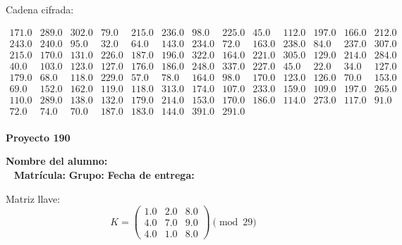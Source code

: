 \documentclass[12pt]{article}
\begin{document}
Cadena cifrada:
\begin{center}
$\begin{array}{lllllllllllll}
171.0 & 289.0 & 302.0 & 79.0 & 215.0 & 236.0 & 98.0 & 225.0 & 45.0 & 112.0 & 197.0 & 166.0 & 212.0\\
243.0 & 240.0 & 95.0 & 32.0 & 64.0 & 143.0 & 234.0 & 72.0 & 163.0 & 238.0 & 84.0 & 237.0 & 307.0\\
215.0 & 170.0 & 131.0 & 226.0 & 187.0 & 196.0 & 322.0 & 164.0 & 221.0 & 305.0 & 129.0 & 214.0 & 284.0\\
40.0 & 103.0 & 123.0 & 127.0 & 176.0 & 186.0 & 248.0 & 337.0 & 227.0 & 45.0 & 22.0 & 34.0 & 127.0\\
179.0 & 68.0 & 118.0 & 229.0 & 57.0 & 78.0 & 164.0 & 98.0 & 170.0 & 123.0 & 126.0 & 70.0 & 153.0\\
69.0 & 152.0 & 162.0 & 119.0 & 118.0 & 313.0 & 174.0 & 107.0 & 233.0 & 159.0 & 109.0 & 197.0 & 265.0\\
110.0 & 289.0 & 138.0 & 132.0 & 179.0 & 214.0 & 153.0 & 170.0 & 186.0 & 114.0 & 273.0 & 117.0 & 91.0\\
72.0 & 74.0 & 70.0 & 187.0 & 183.0 & 144.0 & 391.0 & 291.0\\
\end{array}$
\end{center}

\newpage


\textbf{Proyecto 190}

\textbf{Nombre del alumno:} \underline{\hspace{13cm}}\\\
\vspace{1cm}
\textbf{Matrícula:} \underline{\hspace{4cm}} \hspace{1cm}
\textbf{Grupo:} \underline{\hspace{2cm}}
\textbf{Fecha de entrega:} \underline{\hspace{2cm}}

\medskip

Matriz llave:
\[
K = \begin{pmatrix}
1.0 & 2.0 & 8.0\\
4.0 & 7.0 & 9.0\\
4.0 & 1.0 & 8.0
\end{pmatrix} \pmod{29}
\]
\end{document}
